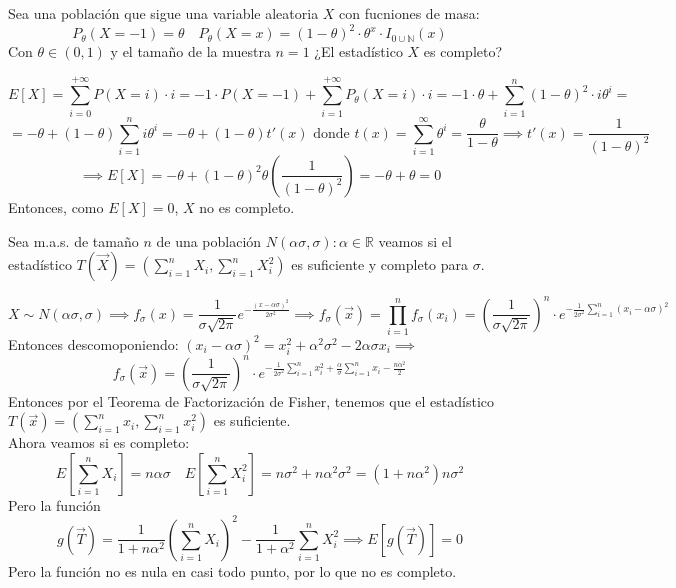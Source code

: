 \begin{problem}{2.5}
	Sea una población que sigue una variable aleatoria $X$ con fucniones de masa: 
	$$P_{\theta}(X = -1) = \theta \quad P_{\theta}(X = x) = (1 - \theta)^2\cdot\theta^x\cdot I_{0 \cup \mathbb{N}}(x)$$
	Con $\theta \in (0, 1)$	y el tamaño de la muestra $n = 1$ ¿El estadístico $X$ es completo?
\end{problem}
\begin{sol}
	$$E[X] = \sum_{i = 0}^{+\infty} P(X = i) \cdot i = -1\cdot P(X = -1) + \sum_{i = 1}^{+\infty} P_{\theta}(X = i) \cdot i = -1 \cdot \theta + \sum_{i = 1}^{n} (1 - \theta)^2 \cdot i\theta^{i} = $$ $$ = -\theta + (1 - \theta) \sum_{i = 1}^{n}i\theta^{i} = -\theta + (1 - \theta)t'(x) \text{ donde } t(x) = \sum_{i = 1}^{\infty}\theta^i = \frac{\theta}{1 - \theta} \implies t'(x) = \frac{1}{(1-\theta)^2}$$ $$\implies E[X] = -\theta + (1 - \theta)^2\theta(\frac{1}{(1 - \theta)^2}) = -\theta + \theta = 0$$
	Entonces, como $E[X] = 0$, $X$ no es completo.
\end{sol}
\begin{problem}{2.6}
	Sea m.a.s. de tamaño $n$ de una población $N(\alpha\sigma, \sigma) : \alpha \in \mathbb{R}$ veamos si el estadístico $T(\vec{X}) = (\sum_{i = 1}^{n}X_i, \sum_{i = 1}^{n}X_i^2)$ es suficiente y completo para $\sigma$.
\end{problem}
\begin{sol}
	$$X \sim N(\alpha\sigma, \sigma) \implies f_{\sigma}(x) = \frac{1}{\sigma\sqrt{2\pi}}e^{-\frac{(x - \alpha\sigma)^2}{2\sigma^2}} \implies f_{\sigma}(\vec{x}) = \prod_{i = 1}^{n}f_{\sigma}(x_i) = \left(\frac{1}{\sigma\sqrt{2\pi}}\right)^n \cdot e^{-\frac{1}{2\sigma^2}\sum_{i = 1}^{n}(x_i - \alpha\sigma)^2}$$
	Entonces descomoponiendo: $(x_i - \alpha\sigma)^2 = x_i^2 + \alpha^2\sigma^2 - 2\alpha\sigma x_i \implies$
	$$f_{\sigma}(\vec{x}) = \left(\frac{1}{\sigma\sqrt{2\pi}}\right)^n \cdot e^{-\frac{1}{2\sigma^2}\sum_{i = 1}^{n}x_i^2 + \frac{\alpha}{\sigma}\sum_{i = 1}^{n}x_i  - \frac{n\alpha^2}{2}} $$
	Entonces por el Teorema de Factorización de Fisher, tenemos que el estadístico $T(\vec{x}) = (\sum_{i = 1}^{n}x_i, \sum_{i = 1}^{n}x_i^2)$ es suficiente. \\
	Ahora veamos si es completo:\\
	$$E\left[\sum_{i = 1}^{n}X_i\right] = n\alpha\sigma \quad E\left[\sum_{i = 1}^{n}X_i^2\right] = n\sigma^2 + n\alpha^2\sigma^2 = (1 + n\alpha^2)n\sigma^2$$
	Pero la función 
	$$g(\vec{T}) = \frac{1}{1 + n\alpha^2}\left(\sum_{i = 1}^{n}X_i\right)^2 - \frac{1}{1 + \alpha^2}\sum_{i = 1}^{n}X_i^2 \implies E[g(\vec{T})] = 0$$
	Pero la función no es nula en casi todo punto, por lo que no es completo. 
\end{sol}
